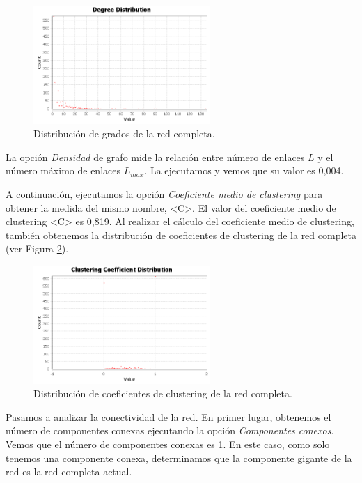 \documentclass{uimppracticas}
\begin{document}
\begin{figure}[H]
	\centering
	\includegraphics[width=0.6\textwidth]{images/degree-distribution}
	\caption{Distribución de grados de la red completa.}
	\label{degree-distribution}
\end{figure}

La opción \textit{Densidad} de grafo mide la relación entre número de enlaces $L$ y el número máximo de enlaces $L_{max}$. La ejecutamos y vemos que su valor es 0,004.

A continuación, ejecutamos la opción \textit{Coeficiente medio de clustering} para obtener la medida del mismo nombre, <C>. El valor del coeficiente medio de clustering <C> es 0,819. Al realizar el cálculo del coeficiente medio de clustering, también obtenemos la distribución de coeficientes de clustering de la red completa (ver Figura \ref{clustering-coefficient}).

\begin{figure}[H]
	\centering
	\includegraphics[width=0.6\textwidth]{images/clustering-coefficient}
	\caption{Distribución de coeficientes de clustering de la red completa.}
	\label{clustering-coefficient}
\end{figure}

Pasamos a analizar la conectividad de la red. En primer lugar, obtenemos el número de componentes conexas ejecutando la opción \textit{Componentes conexos}. Vemos  que el número de componentes conexas es 1. En este caso, como solo tenemos una componente conexa, determinamos que la componente gigante de la red es la red completa actual.
\end{document}
